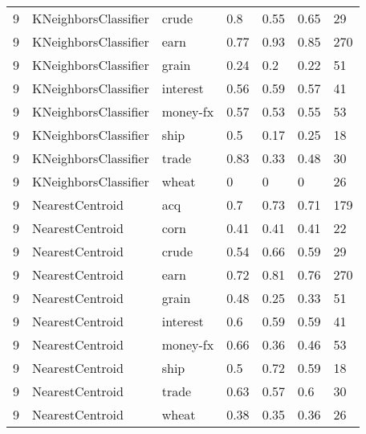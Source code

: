 \documentclass{article}
\begin{document}
\begin{table}[h]
\begin{tabular}{lllllll}
9             & KNeighborsClassifier   & crude           & 0.8                & 0.55            & 0.65              & 29               \\
9             & KNeighborsClassifier   & earn            & 0.77               & 0.93            & 0.85              & 270              \\
9             & KNeighborsClassifier   & grain           & 0.24               & 0.2             & 0.22              & 51               \\
9             & KNeighborsClassifier   & interest        & 0.56               & 0.59            & 0.57              & 41               \\
9             & KNeighborsClassifier   & money-fx        & 0.57               & 0.53            & 0.55              & 53               \\
9             & KNeighborsClassifier   & ship            & 0.5                & 0.17            & 0.25              & 18               \\
9             & KNeighborsClassifier   & trade           & 0.83               & 0.33            & 0.48              & 30               \\
9             & KNeighborsClassifier   & wheat           & 0                  & 0               & 0                 & 26               \\
9             & NearestCentroid        & acq             & 0.7                & 0.73            & 0.71              & 179              \\
9             & NearestCentroid        & corn            & 0.41               & 0.41            & 0.41              & 22               \\
9             & NearestCentroid        & crude           & 0.54               & 0.66            & 0.59              & 29               \\
9             & NearestCentroid        & earn            & 0.72               & 0.81            & 0.76              & 270              \\
9             & NearestCentroid        & grain           & 0.48               & 0.25            & 0.33              & 51               \\
9             & NearestCentroid        & interest        & 0.6                & 0.59            & 0.59              & 41               \\
9             & NearestCentroid        & money-fx        & 0.66               & 0.36            & 0.46              & 53               \\
9             & NearestCentroid        & ship            & 0.5                & 0.72            & 0.59              & 18               \\
9             & NearestCentroid        & trade           & 0.63               & 0.57            & 0.6               & 30               \\
9             & NearestCentroid        & wheat           & 0.38               & 0.35            & 0.36              & 26               \\\end{tabular}
\end{table}
\end{document}
